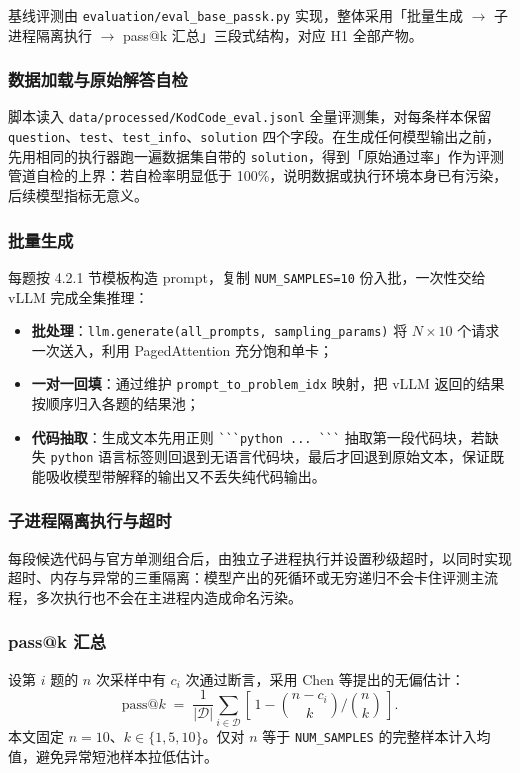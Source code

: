 
基线评测由 \texttt{evaluation/eval\_base\_passk.py} 实现，整体采用「批量生成 $\to$ 子进程隔离执行 $\to$ pass@k 汇总」三段式结构，对应 H1 全部产物。

\subsubsection{数据加载与原始解答自检}
脚本读入 \texttt{data/processed/KodCode\_eval.jsonl} 全量评测集，对每条样本保留 \texttt{question}、\texttt{test}、\texttt{test\_info}、\texttt{solution} 四个字段。在生成任何模型输出之前，先用相同的执行器跑一遍数据集自带的 \texttt{solution}，得到「原始通过率」作为评测管道自检的上界：若自检率明显低于 100\%，说明数据或执行环境本身已有污染，后续模型指标无意义。

\subsubsection{批量生成}
每题按 4.2.1 节模板构造 prompt，复制 \texttt{NUM\_SAMPLES=10} 份入批，一次性交给 vLLM 完成全集推理：
\begin{itemize}
    \item \textbf{批处理}：\texttt{llm.generate(all\_prompts, sampling\_params)} 将 $N \times 10$ 个请求一次送入，利用 PagedAttention 充分饱和单卡；
    \item \textbf{一对一回填}：通过维护 \texttt{prompt\_to\_problem\_idx} 映射，把 vLLM 返回的结果按顺序归入各题的结果池；
    \item \textbf{代码抽取}：生成文本先用正则 \verb|```python ... ```| 抽取第一段代码块，若缺失 \texttt{python} 语言标签则回退到无语言代码块，最后才回退到原始文本，保证既能吸收模型带解释的输出又不丢失纯代码输出。
\end{itemize}

\subsubsection{子进程隔离执行与超时}
每段候选代码与官方单测组合后，由独立子进程执行并设置秒级超时，以同时实现超时、内存与异常的三重隔离：模型产出的死循环或无穷递归不会卡住评测主流程，多次执行也不会在主进程内造成命名污染。

\subsubsection{pass@k 汇总}
设第 $i$ 题的 $n$ 次采样中有 $c_i$ 次通过断言，采用 Chen 等提出的无偏估计：
\[
\mathrm{pass@}k \;=\; \frac{1}{|\mathcal{D}|}\sum_{i \in \mathcal{D}}\!\left[\,1 - \binom{n-c_i}{k}\Big/\binom{n}{k}\,\right].
\]
本文固定 $n{=}10$、$k \in \{1,5,10\}$。仅对 $n$ 等于 \texttt{NUM\_SAMPLES} 的完整样本计入均值，避免异常短池样本拉低估计。

